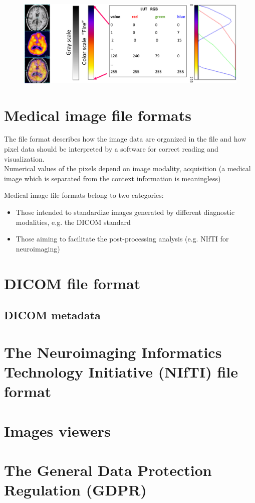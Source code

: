 \begin{figure}[ht]
	\centering
	\includegraphics[width=0.9\linewidth]{figure_med/luts}
\end{figure}
\FloatBarrier

\section{Medical image file formats}

The file format describes how the image data are organized in the file and how pixel data should be interpreted by a software for correct reading and visualization.\\
Numerical values of the pixels depend on image modality, acquisition (a medical image which is separated from the context information is meaningless)

Medical image file formats belong to two categories:
\begin{itemize}
	\item Those intended to standardize images generated by different diagnostic modalities, e.g. the DICOM standard
	\item Those aiming to facilitate the post-processing analysis (e.g. NIfTI for neuroimaging)
\end{itemize}

\section{DICOM file format}

\subsection{DICOM metadata}

\section{The Neuroimaging Informatics Technology Initiative (NIfTI) file format}

\section{Images viewers}

\section{The General Data Protection Regulation (GDPR)}
